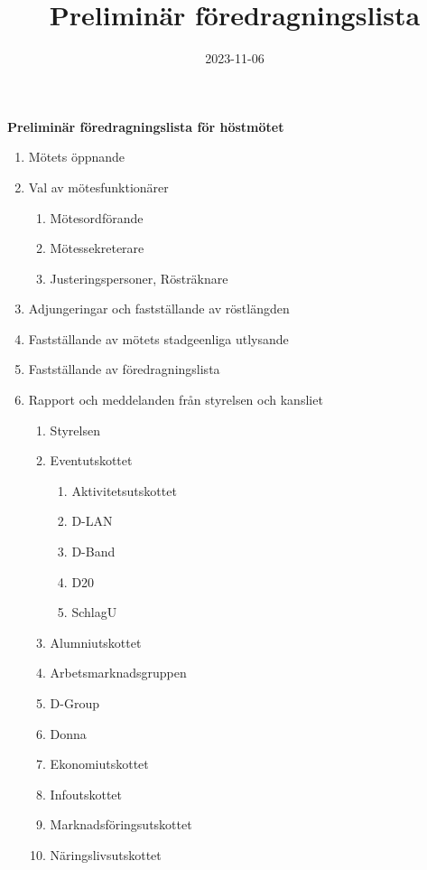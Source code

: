 \documentclass{datateknologsektionen-document}
\title{Preliminär föredragningslista}
\date{2023-11-06}
\begin{document}
\large
\begin{center}
  {\LARGE\bfseries Preliminär föredragningslista för höstmötet}
  \vspace{2mm}
\end{center}

\Large
\begin{enumerate}[topsep=0pt,itemsep=1ex]
  \item Mötets öppnande
  \item Val av mötesfunktionärer
        \begin{enumerate}[label*=\arabic*.,leftmargin=3em]
          \item Mötesordförande
          \item Mötessekreterare
          \item Justeringspersoner, Rösträknare
        \end{enumerate}
  \item Adjungeringar och fastställande av röstlängden
  \item Fastställande av mötets stadgeenliga utlysande
  \item Fastställande av föredragningslista
  \item Rapport och meddelanden från styrelsen och kansliet
        \begin{enumerate}[label*=\arabic*.,leftmargin=3em]
          \item Styrelsen
          \item Eventutskottet
            \begin{enumerate}[label*=\arabic*.,leftmargin=2em]
                \item Aktivitetsutskottet
                \item D-LAN
                \item D-Band
                \item D20
                \item SchlagU
            \end{enumerate}
          \item Alumniutskottet
          \item Arbetsmarknadsgruppen
          \item D-Group
          \item Donna
          \item Ekonomiutskottet
          \item Infoutskottet
          \item Marknadsföringsutskottet
          \item Näringslivsutskottet

\end{enumerate}
\end{enumerate}
\end{document}
